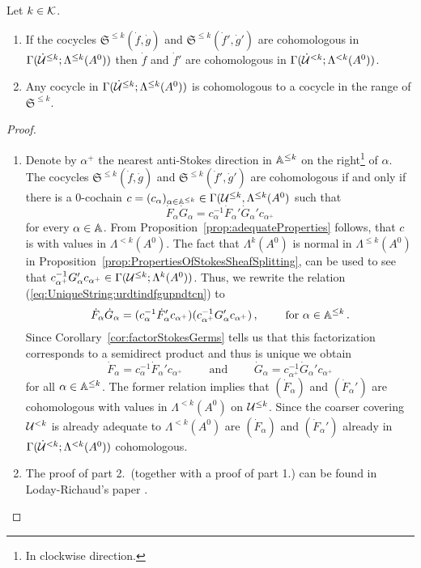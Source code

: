 \begin{lem}
  Let $k\in\mathcal{K}$.
  \begin{enumerate}
    \item If the cocycles $\mathfrak{S}^{\leq k}(\dot f,\dot g)$ and
      $\mathfrak{S}^{\leq k}(\dot f',\dot g')$ are cohomologous in
      $\Gamma(\dot{\mathcal{U}}^{\leq k};\Lambda^{\leq k}(A^0))$
      then $\dot f$ and $\dot f'$ are cohomologous in
      $\Gamma(\dot{\mathcal{U}}^{<k};\Lambda^{<k}(A^0))$.
    \item Any cocycle in $\Gamma(\dot{\mathcal{U}}^{\leq k};\Lambda^{\leq k}(A^0))$ is
      cohomologous to a cocycle in the range of $\mathfrak{S}^{\leq k}$.
  \end{enumerate}
\end{lem}
\begin{proof}
  \begin{enumerate}
    \item Denote by $\alpha^+$ the nearest anti-Stokes direction in
      $\mathbb{A}^{\leq k}$ on the right\footnote{In clockwise direction.} of $\alpha$.
      The cocycles $\mathfrak{S}^{\leq k}(\dot f,\dot g)$ and
      $\mathfrak{S}^{\leq k}(\dot f',\dot g')$ are cohomologous if and only
      if there is a $0$-cochain $c=(c_\alpha)_{\alpha\in\mathbb{A}^{\leq k}}
      \in\Gamma(\mathcal{U}^{\leq k},\Lambda^{\leq k}(A^0)$ such that
      \begin{equation}\label{eq:UniqueString:urdtindfgupndtcn}
        \dot F_\alpha\dot G_\alpha =
        c_\alpha^{-1}\dot F_\alpha'\dot G_\alpha'c_{\alpha^+}
      \end{equation}
      for every $\alpha\in\mathbb{A}$. From Proposition~\ref{prop:adequateProperties}
      follows, that $c$ is with values in $\Lambda^{<k}(A^0)$.
      The fact that $\Lambda^k(A^0)$ is normal in $\Lambda^{\leq k}(A^0)$ in
      Proposition~\ref{prop:PropertiesOfStokesSheafSplitting}, can be used to
      see that $ c_{\alpha^+}^{-1}G_\alpha'c_{\alpha^+}
      \in\Gamma(\mathcal{U}^{\leq k};\Lambda^{k}(A^0))$.
      Thus, we rewrite the relation (\ref{eq:UniqueString:urdtindfgupndtcn}) to
      \[
        \dot F_\alpha\dot G_\alpha =
        (c_\alpha^{-1}\dot F_\alpha'c_{\alpha^+})
        (c_{\alpha^+}^{-1}G_\alpha'c_{\alpha^+})
        \,,\qquad\text{~for~} \alpha\in\mathbb{A}^{\leq k} \,.
      \]
      Since Corollary~\ref{cor:factorStokesGerms} tells us that this
      factorization corresponds to a semidirect product and thus is unique we
      obtain
      \[
        \dot F_\alpha=c_\alpha^{-1}\dot F_\alpha'c_{\alpha^+}
        \qquad \text{~and~} \qquad
        \dot G_\alpha=c_{\alpha^+}^{-1}\dot G_\alpha'c_{\alpha^+}
      \]
      for all $\alpha\in\mathbb{A}^{\leq k}$.
      The former relation implies that $(\dot F_\alpha)$ and $(\dot F_\alpha')$
      are cohomologous with values in $\Lambda^{<k}(A^0)$ on $\mathcal{U}^{\leq k}$.
      Since the coarser covering $\mathcal{U}^{<k}$ is already adequate to
      $\Lambda^{<k}(A^0)$ are $(\dot F_\alpha)$ and $(\dot F_\alpha')$ already
      in $\Gamma(\dot{\mathcal{U}}^{<k};\Lambda^{<k}(A^0))$ cohomologous.
    \item The proof of part 2.\ (together with a proof of part 1.) can be
      found in Loday-Richaud's paper \cite[Proof of Lem.II.3.3]{Loday1994}.
  \end{enumerate}
\end{proof}
